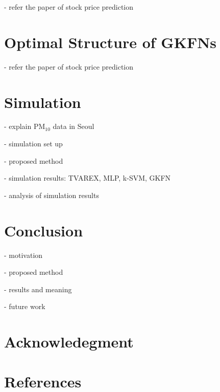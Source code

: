 \documentclass[preprint,12pt]{elsarticle}
\begin{document}
- refer the paper of stock price prediction



\section{Optimal Structure of GKFNs}

- refer the paper of stock price prediction



\newpage
\section{Simulation}

- explain PM$_{10}$ data in Seoul

- simulation set up

- proposed method

- simulation results: TVAREX, MLP, k-SVM, GKFN

- analysis of simulation results



\section{Conclusion}

- motivation

- proposed method

- results and meaning

- future work



\section*{Acknowledegment}



\section*{References}




\end{document}
